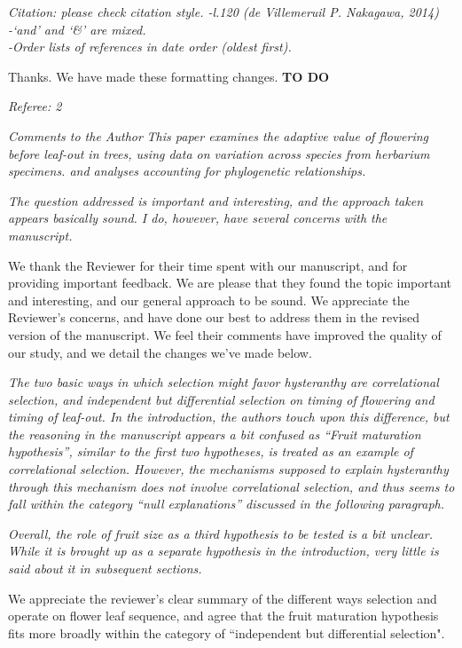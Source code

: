 \documentclass{article}[12pt]
\begin{document}
\emph{Citation: please check citation style.
-l.120 (de Villemeruil P. Nakagawa, 2014)\\
-‘and’ and ‘&’ are mixed.\\
-Order lists of references in date order (oldest first).}

Thanks. We have made these formatting changes. \textbf{TO DO}

\emph{Referee: 2}

\emph{Comments to the Author}
\emph{This paper examines the adaptive value of flowering before leaf-out in trees, using data on variation across species from herbarium specimens. and analyses accounting for phylogenetic relationships.}

\emph{The question addressed is important and interesting, and the approach taken appears basically sound. I do, however, have several concerns with the manuscript.}

We thank the Reviewer for their time spent with our manuscript, and for providing important feedback. We are please that they found the topic important and interesting, and our general approach to be sound. We appreciate the  Reviewer's concerns, and have done our best to address them in the revised version of the manuscript. We feel their comments have improved the quality of our study, and we detail the changes we've made below.

\emph{The two basic ways in which selection might favor hysteranthy are correlational selection, and independent but differential selection on timing of flowering and timing of leaf-out. In the introduction, the authors touch upon this difference, but the reasoning in the manuscript appears a bit confused as “Fruit maturation hypothesis”, similar to the first two hypotheses, is treated as an example of correlational selection. However, the mechanisms supposed to explain hysteranthy through this mechanism does not involve correlational selection, and thus seems to fall within the category “null explanations” discussed in the following paragraph.}

\emph{Overall, the role of fruit size as a third hypothesis to be tested is a bit unclear. While it is brought up as a separate hypothesis in the introduction, very little is said about it in subsequent sections.}

We appreciate the reviewer's clear summary of the different ways selection and operate on flower leaf sequence, and agree that the fruit maturation hypothesis fits more broadly within the category of ``independent but differential selection".
\end{document}
